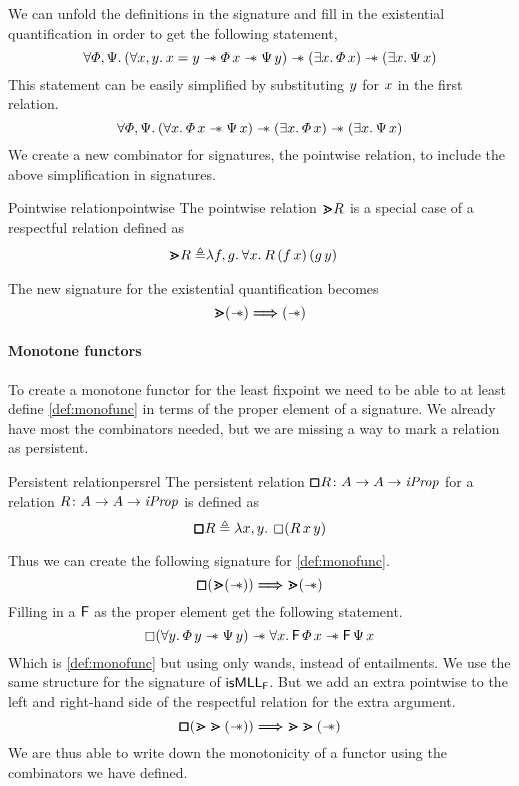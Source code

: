 \documentclass[thesis.tex]{subfiles}
\begin{document}

We can unfold the definitions in the signature and fill in the existential quantification in order to get the following statement,
\[\All \pred, \predB. (\All \var, \varB. \var = \varB \wand \pred\, \var \wand \predB\, \varB) \wand (\Exists \var. \pred\, \var) \wand (\Exists \var. \predB\, \var) \]
This statement can be easily simplified by substituting $y$ for $x$ in the first relation.
\[\All \pred, \predB. (\All \var. \pred\, \var \wand \predB\, \var) \wand (\Exists \var. \pred\, \var) \wand (\Exists \var. \predB\, \var) \]
We create a new combinator for signatures, the pointwise relation, to include the above simplification in signatures.
\begin{definition}{Pointwise relation}{pointwise}
    The pointwise relation $\bm{\gtrdot} R$ is a special case of a respectful relation defined as
    \begin{align*}
        \point \rel \eqdef & \Lam \func, \funcB. \All \var. \rel\, (\func\, \var)\, (\funcB\, \varB)
    \end{align*}
\end{definition}
\noindent The new signature for the existential quantification becomes
\[\bm{\gtrdot} (\mathrel{-\!\!\ast}) \bm{\Longrightarrow} (\mathrel{-\!\!\ast})\]

\paragraph*{Monotone functors}
To create a monotone functor for the least fixpoint we need to be able to at least define \cref*{def:monofunc} in terms of the proper element of a signature. We already have most the combinators needed, but we are missing a way to mark a relation as persistent.
\begin{definition}{Persistent relation}{persrel}
    The persistent relation $\pmb{\mathop{\boxempty}}R\colon A\to A\to\textit{iProp}$ for a relation $R\colon A\to A\to\textit{iProp}$ is defined as
    \[\persrel\rel \eqdef \Lam\var,\varB. \always (\rel\,\var\,\varB)\]
\end{definition}
\noindent Thus we can create the following signature for \cref*{def:monofunc}.
\[\pmb{\mathop{\boxempty}} (\bm{\gtrdot} (\mathrel{-\!\!\ast})) \bm{\Longrightarrow} \bm{\gtrdot} (\mathrel{-\!\!\ast})\]
Filling in a $\textsf{\upshape F}$ as the proper element get the following statement.
\[ \always(\All \varB. \pred\,\varB \wand \predB\,\varB) \wand \All \var. \hopred\,\pred\,\var \wand \hopred\,\predB\,\var \]
Which is \cref*{def:monofunc} but using only wands, instead of entailments. We use the same structure for the signature of $\textsf{\upshape isMLL}_{\textsf{\upshape F}}$. But we add an extra pointwise to the left and right-hand side of the respectful relation for the extra argument.
\[\pmb{\mathop{\boxempty}} (\bm{\gtrdot}\bm{\gtrdot} (\mathrel{-\!\!\ast})) \bm{\Longrightarrow} \bm{\gtrdot}\bm{\gtrdot} (\mathrel{-\!\!\ast})\]
We are thus able to write down the monotonicity of a functor using the combinators we have defined.
\end{document}
